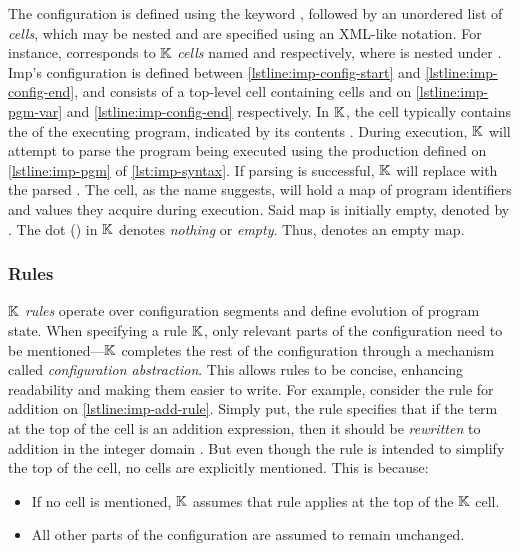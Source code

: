 The configuration is defined using the keyword ,
followed by an unordered list of \emph{cells},
which may be nested and are specified using an XML-like notation.
For instance, 
corresponds to $\mathbb{K}$ \emph{cells} named
 and  respectively, where 
is nested under .
Imp's configuration is defined
between \autoref{lstline:imp-config-start} and \autoref{lstline:imp-config-end},
and consists of a top-level cell  containing cells
 and  on \autoref{lstline:imp-pgm-var} and
\autoref{lstline:imp-config-end} respectively. In $\mathbb{K}{}$,
the  cell typically contains the \AST{} of the executing
program, indicated by its contents .
During execution, $\mathbb{K}{}$ will attempt to parse the program being executed
using the production  defined on \autoref{lstline:imp-pgm} of
\autoref{lst:imp-syntax}. If parsing is successful, $\mathbb{K}{}$ will replace
 with the parsed \AST{}. The  cell,
as the name suggests, will hold a map of
program identifiers and values they acquire during execution.
Said map is initially empty, denoted by .
The dot () in $\mathbb{K}{}$ denotes \emph{nothing} or \emph{empty}.
Thus,  denotes an empty map.

\subsubsection{Rules}\label{sec:k-rules}
$\mathbb{K}$ \emph{rules} operate over configuration segments and define evolution of
program state. When specifying a rule $\mathbb{K}{}$, only relevant parts of the
configuration need to be mentioned---$\mathbb{K}{}$ completes the rest of the
configuration through a mechanism called \emph{configuration abstraction}.
This allows rules to be concise,
enhancing readability and making them easier to write. For example,
consider the rule for addition on \autoref{lstline:imp-add-rule}.
Simply put, the rule specifies that if the term at the top of the 
cell is an addition expression, then it should be \emph{rewritten} to
addition in the integer domain . But even though the
rule is intended to simplify the top of the  cell,
no cells are explicitly mentioned. This is because:
\begin{itemize}
  \item If no cell is mentioned, $\mathbb{K}$ assumes that rule applies at the top of
    the $\mathbb{K}{}$ cell.
  \item All other parts of the configuration are assumed to remain unchanged.
\end{itemize}

